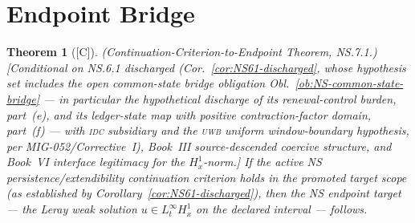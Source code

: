 \documentclass[12pt,oneside]{amsbook}
\theoremstyle{plain}
\newtheorem{theorem}{Theorem}[section]
\theoremstyle{definition}
\theoremstyle{remark}
\newcommand{\status}[1]{\textup{[#1]}}
\begin{document}
\section{Endpoint Bridge}

\begin{theorem}[\status{C}]\label{thm:NS71}
\textup{(Continuation-Criterion-to-Endpoint Theorem, NS.7.1.)}
\textup{[Conditional on NS.6.1 discharged
(Cor.~\ref{cor:NS61-discharged}, whose hypothesis set includes the
open common-state bridge obligation
Obl.~\ref{ob:NS-common-state-bridge} --- in particular the
hypothetical discharge of its renewal-control burden, part~(e), and
its ledger-state map with positive contraction-factor domain,
part~(f) --- with \textsc{idc} subsidiary and the \textsc{uwb}
uniform window-boundary hypothesis, per MIG-052/Corrective~I),
Book~III source-descended coercive structure, and Book~VI interface
legitimacy for the $H^1_x$-norm.]}
If the active NS persistence/extendibility continuation criterion
holds in the promoted target scope (as established by
Corollary~\ref{cor:NS61-discharged}), then the NS endpoint
target --- the Leray weak solution $u \in L^\infty_t H^1_x$ on
the declared interval --- follows.
\end{theorem}
\end{document}
